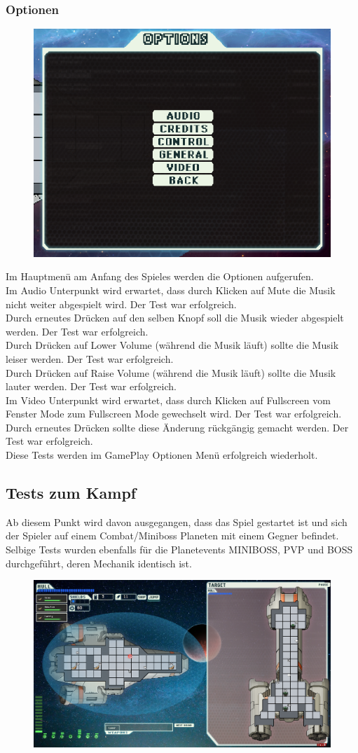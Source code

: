 \documentclass[fontsize=12pt,paper=a4,twoside]{scrartcl}
\begin{document}
\subsubsection{Optionen}
\begin{figure}[h!]
\centering
\includegraphics[width=0.5\linewidth]{images/options.png}
\end{figure}
Im Hauptmenü am Anfang des Spieles werden die Optionen aufgerufen. \\
Im Audio Unterpunkt wird erwartet, dass durch Klicken auf Mute die Musik nicht weiter abgespielt wird. Der Test war erfolgreich. \\
Durch erneutes Drücken auf den selben Knopf soll die Musik wieder abgespielt werden. Der Test war erfolgreich. \\
Durch Drücken auf Lower Volume (während die Musik läuft) sollte die Musik leiser werden. Der Test war erfolgreich. \\
Durch Drücken auf Raise Volume (während die Musik läuft) sollte die Musik lauter werden. Der Test war erfolgreich. \\
Im Video Unterpunkt wird erwartet, dass durch Klicken auf Fullscreen vom Fenster Mode zum Fullscreen Mode gewechselt wird.  Der Test war erfolgreich. \\
Durch erneutes Drücken sollte diese Änderung rückgängig gemacht werden.  Der Test war erfolgreich. \\
Diese Tests werden im GamePlay Optionen Menü erfolgreich wiederholt. \\



\subsection{Tests zum Kampf}
Ab diesem Punkt wird davon ausgegangen, dass das Spiel gestartet ist und sich der Spieler auf einem Combat/Miniboss Planeten mit einem Gegner befindet. Selbige Tests wurden ebenfalls für die Planetevents MINIBOSS, PVP und BOSS durchgeführt, deren Mechanik identisch ist. \\
\begin{figure}[h!]
\centering
\includegraphics[width=0.5\linewidth]{images/battle.png}
\end{figure}
\end{document}

